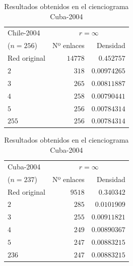 \documentclass[10pt,a4paper,spanish]{article}
\numberwithin{equation}{section} %
\numberwithin{figure}{section} %
\numberwithin{table}{section} %
\begin{document}
\begin{table}[!h]
\begin{minipage}{0.5\textwidth}
\centering
\begin{tabular}{lrr}
\hline
 Chile-2004 & \multicolumn{2}{c}{$r = \infty$} \\
($n=256$)   &   Nº  enlaces &    Densidad \\
\hline
 Red original             &               $14778$ & $0.452757$ \\
 $2$                        &                 $318$ & $0.00974265$  \\
 $3$                        &                 $265$ & $0.00811887$  \\
 $4$                        &                 $258$ & $0.00790441$   \\
 $5$                        &                 $256$ & $0.00784314$  \\
 $255$                      &                 $256$ & $0.00784314$  \\
\hline
\end{tabular}
\caption{Resultados obtenidos en el cienciograma Chile-2004}
\label{chile2004}
\end{minipage}
\begin{minipage}{0.5\textwidth}
\centering
\begin{tabular}{lrr}
\hline
 Cuba-2004 & \multicolumn{2}{c}{$r = \infty$} \\
($n=237$)   &   Nº  enlaces &   Densidad \\
\hline
 Red original            &                $9518$ & $0.340342$ \\
 $2$                       &                 $285$ & $0.0101909$ \\
 $3$                       &                 $255$ & $0.00911821$ \\
 $4$                       &                 $249$ & $0.00890367$ \\
 $5$                       &                 $247$ & $0.00883215$ \\
 $236$                     &                 $247$ & $0.00883215$ \\
\hline
\end{tabular}
\caption{Resultados obtenidos en el cienciograma Cuba-2004}
\label{cuba2004}
\end{minipage}
\end{table}
\end{document}
